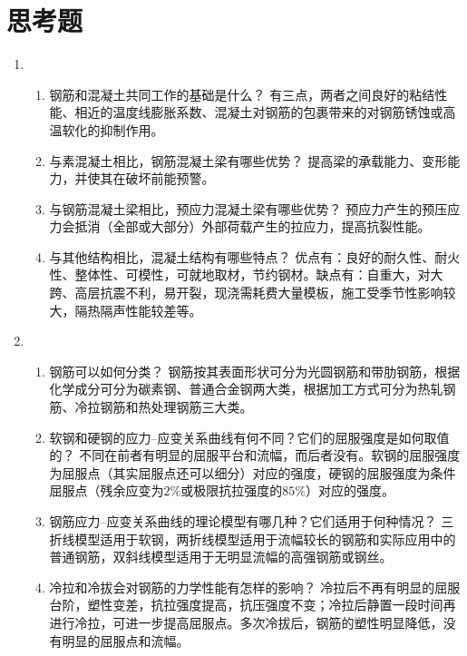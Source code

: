 \documentclass{article}
\begin{document}
\section{思考题}
\begin{enumerate}
      \item
            \begin{enumerate}[1.]
                  \item 钢筋和混凝土共同工作的基础是什么？
                        \ans 有三点，两者之间良好的粘结性能、相近的温度线膨胀系数、混凝土对钢筋的包裹带来的对钢筋锈蚀或高温软化的抑制作用。
                  \item 与素混凝土相比，钢筋混凝土梁有哪些优势？
                        \ans 提高梁的承载能力、变形能力，并使其在破坏前能预警。
                  \item 与钢筋混凝土梁相比，预应力混凝土梁有哪些优势？
                        \ans 预应力产生的预压应力会抵消（全部或大部分）外部荷载产生的拉应力，提高抗裂性能。
                  \item 与其他结构相比，混凝土结构有哪些特点？
                        \ans 优点有：良好的耐久性、耐火性、整体性、可模性，可就地取材，节约钢材。缺点有：自重大，对大跨、高层抗震不利，易开裂，现浇需耗费大量模板，施工受季节性影响较大，隔热隔声性能较差等。
            \end{enumerate}
      \item \begin{enumerate}[1.]
                  \item 钢筋可以如何分类？
                        \ans 钢筋按其表面形状可分为光圆钢筋和带肋钢筋，根据化学成分可分为碳素钢、普通合金钢两大类，根据加工方式可分为热轧钢筋、冷拉钢筋和热处理钢筋三大类。
                  \item 软钢和硬钢的应力--应变关系曲线有何不同？它们的屈服强度是如何取值的？
                        \ans 不同在前者有明显的屈服平台和流幅，而后者没有。软钢的屈服强度为屈服点（其实屈服点还可以细分）对应的强度，硬钢的屈服强度为条件屈服点（残余应变为$2\%$或极限抗拉强度的$85\%$）对应的强度。
                  \item 钢筋应力--应变关系曲线的理论模型有哪几种？它们适用于何种情况？
                        \ans 三折线模型适用于软钢，两折线模型适用于流幅较长的钢筋和实际应用中的普通钢筋，双斜线模型适用于无明显流幅的高强钢筋或钢丝。
                  \item 冷拉和冷拔会对钢筋的力学性能有怎样的影响？
                        \ans 冷拉后不再有明显的屈服台阶，塑性变差，抗拉强度提高，抗压强度不变；冷拉后静置一段时间再进行冷拉，可进一步提高屈服点。多次冷拔后，钢筋的塑性明显降低，没有明显的屈服点和流幅。

\end{enumerate}
\end{enumerate}
\end{document}
